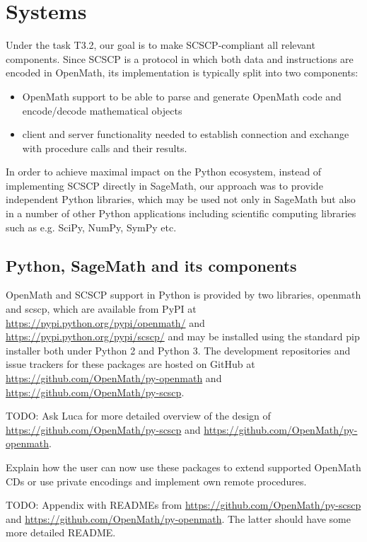 \documentclass{deliverablereport}
\begin{document}
\section{Systems}\label{systems}

Under the task T3.2, our goal is to make SCSCP-compliant all
relevant components. Since SCSCP is a protocol in which 
both data and instructions are encoded in OpenMath, its
implementation is typically split into two components: 
\begin{itemize}
\item OpenMath support to be able to parse and 
generate OpenMath code and encode/decode mathematical objects
\item client and server functionality needed to establish connection
and exchange with procedure calls and their results.
\end{itemize}

In order to achieve maximal impact on the Python ecosystem, 
instead of implementing SCSCP directly in SageMath, our approach
was to provide independent Python libraries, which may be used not
only in SageMath but also in a number of other Python applications
including scientific computing libraries such as e.g. 
SciPy, NumPy, SymPy etc.



\subsection{Python, SageMath and its components}

OpenMath and SCSCP support in Python is provided by two libraries, 
{\sf openmath} and {\sf scscp}, which are available from PyPI at
\url{https://pypi.python.org/pypi/openmath/} and
\url{https://pypi.python.org/pypi/scscp/} and
may be installed using the standard {\sf pip} installer 
both under Python 2 and Python 3. The development repositories
and issue trackers for these packages are hosted on GitHub
at \url{https://github.com/OpenMath/py-openmath}
and \url{https://github.com/OpenMath/py-scscp}.

TODO: Ask Luca for more detailed overview of the design of 
\url{https://github.com/OpenMath/py-scscp} 
and \url{https://github.com/OpenMath/py-openmath}. 

Explain how the user can now use these packages to extend supported OpenMath CDs
or use private encodings and implement own remote procedures.

TODO: Appendix with READMEs from \url{https://github.com/OpenMath/py-scscp}
and \url{https://github.com/OpenMath/py-openmath}. The latter should have
some more detailed README.
\end{document}
